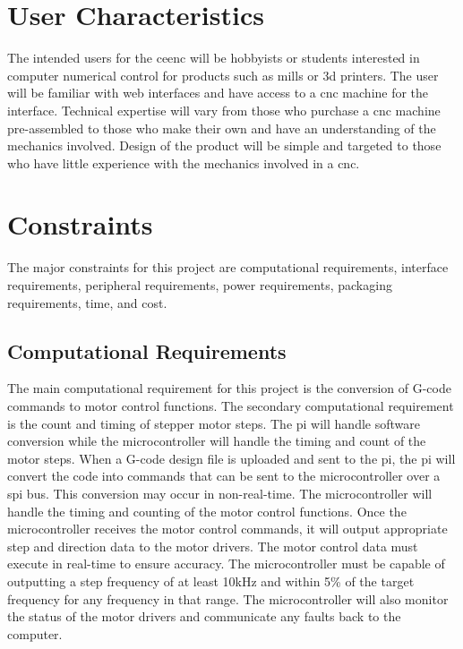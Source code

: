 \section{User Characteristics}
The intended users for the \gls{ceenc} will be hobbyists or students interested in computer numerical control for products such as mills or \gls{3d} printers.
The user will be familiar with web interfaces and have access to a \gls{cnc} machine for the interface.
Technical expertise will vary from those who purchase a \gls{cnc} machine pre-assembled to those who make their own and have an understanding of the mechanics involved.
Design of the product will be simple and targeted to those who have little experience with the mechanics involved in a \gls{cnc}.

\section{Constraints}
The major constraints for this project are computational requirements, interface requirements, peripheral requirements, power requirements, packaging requirements, time, and cost.

\subsection{Computational Requirements}
The main computational requirement for this project is the conversion of G-code commands to motor control functions.
The secondary computational requirement is the count and timing of stepper motor steps.
The \gls{pi} will handle software conversion while the microcontroller will handle the timing and count of the motor steps.
When a G-code design file is uploaded and sent to the \gls{pi}, the \gls{pi} will convert the code into commands that can be sent to the microcontroller over a \gls{spi} bus.
This conversion may occur in non-real-time.
The microcontroller will handle the timing and counting of the motor control functions.
Once the microcontroller receives the motor control commands, it will output appropriate step and direction data to the motor drivers.
The motor control data must execute in real-time to ensure accuracy.
The microcontroller must be capable of outputting a step frequency of at least 10kHz and within 5\% of the target frequency for any frequency in that range.
The microcontroller will also monitor the status of the motor drivers and communicate any faults back to the computer.

